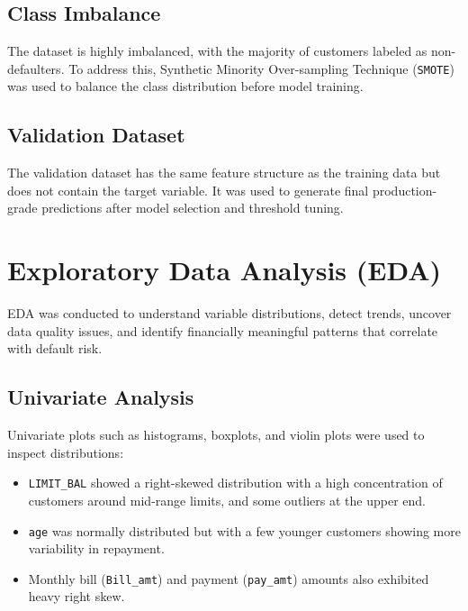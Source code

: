\documentclass[12pt,a4paper]{article}
\begin{document}
\subsection*{Class Imbalance}
The dataset is highly imbalanced, with the majority of customers labeled as non-defaulters. To address this, Synthetic Minority Over-sampling Technique (\texttt{SMOTE}) was used to balance the class distribution before model training.

\subsection*{Validation Dataset}
The validation dataset has the same feature structure as the training data but does not contain the target variable. It was used to generate final production-grade predictions after model selection and threshold tuning.

\section{Exploratory Data Analysis (EDA)}
EDA was conducted to understand variable distributions, detect trends, uncover data quality issues, and identify financially meaningful patterns that correlate with default risk.

\subsection{Univariate Analysis}
Univariate plots such as histograms, boxplots, and violin plots were used to inspect distributions:
\begin{itemize}
    \item \texttt{LIMIT\_BAL} showed a right-skewed distribution with a high concentration of customers around mid-range limits, and some outliers at the upper end.
    
    \item \texttt{age} was normally distributed but with a few younger customers showing more variability in repayment.
    \item Monthly bill (\texttt{Bill\_amt}) and payment (\texttt{pay\_amt}) amounts also exhibited heavy right skew.
\end{itemize}
\end{document}
